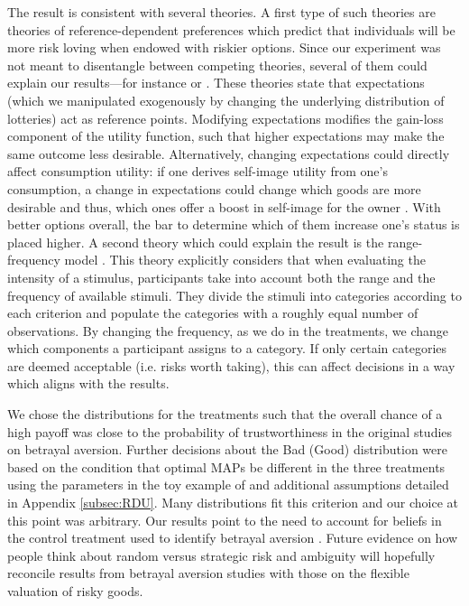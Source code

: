 The result is consistent with several theories.
A first type of such theories are theories of reference-dependent preferences which predict that individuals will be more risk loving when endowed with riskier options.
Since our experiment was not meant to disentangle between competing theories, several of them could explain our results---for instance \cite{Koszegi2006,Koszegi2007} or \cite{Wenner2015}.
These theories state that expectations (which we manipulated exogenously by changing the underlying distribution of lotteries) act as reference points.
Modifying expectations modifies the gain-loss component of the utility function, such that higher expectations may make the same outcome less desirable.
Alternatively, changing expectations could directly affect consumption utility: if one derives self-image utility from one's consumption, a change in expectations could change which goods are more desirable and thus, which ones offer a boost in self-image for the owner \citep{Strahilevitz1998,Marzilli2011}.
With better options overall, the bar to determine which of them increase one's status is placed higher.
A second theory which could explain the result is the range-frequency model \citep{Parducci1965,Parducci1971}.
This theory explicitly considers that when evaluating the intensity of a stimulus, participants take into account both the range and the frequency of available stimuli. They divide the stimuli into categories according to each criterion and populate the categories with a roughly equal number of observations. By changing the frequency, as we do in the treatments, we change which components a participant assigns to a category. If only certain categories are deemed acceptable (i.e. risks worth taking), this can affect decisions in a way which aligns with the results.

We chose the distributions for the treatments such that the overall chance of a high payoff was close to the probability of trustworthiness in the original studies on betrayal aversion.
Further decisions about the Bad (Good) distribution were based on the condition that optimal MAPs be different in the three treatments using the parameters in the toy example of \cite{Li2020a} and additional assumptions detailed in Appendix \ref{subsec:RDU}.
Many distributions fit this criterion and our choice at this point was arbitrary.
Our results point to the need to account for beliefs in the control treatment used to identify betrayal aversion \citep[the Risky Dictator Game in][]{Bohnet2004}.
Future evidence on how people think about random versus strategic risk and ambiguity will hopefully reconcile results from betrayal aversion studies with those on the flexible valuation of risky goods.


